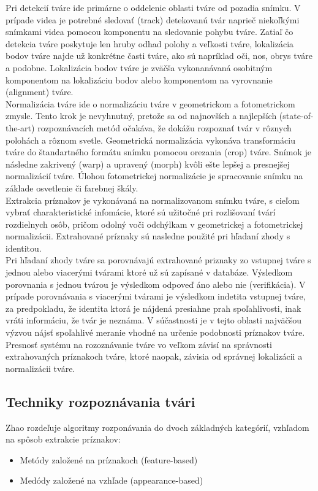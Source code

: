 \indent  Pri detekcií tváre ide primárne o oddelenie oblasti tváre od pozadia snímku.
V prípade videa je potrebné sledovať (track) detekovanú tvár naprieč niekoľkými snímkami videa pomocou komponentu na sledovanie pohybu tváre.
Zatiaľ čo detekcia tváre poskytuje len hruby odhad polohy a veľkosti tváre, lokalizácia bodov tváre najde už konkrétne časti tváre,
ako sú napríklad oči, nos, obrys tváre a podobne.
Lokalizácia bodov tváre je zväčša vykonanávaná osobitným komponentom na lokalizáciu bodov alebo komponentom na vyrovnanie (alignment) tváre.\cite{handbookface}\\
Normalizácia tváre ide o normalizáciu tváre v geometrickom a fotometrickom zmysle.
Tento krok je nevyhnutný, pretože sa od najnovších a najlepších (state-of-the-art) rozpoznávacích metód očakáva, že dokážu rozpoznať tvár v rôznych polohách a rôznom svetle.
Geometrická normalizácia vykonáva transformáciu tváre do štandartného formátu snímku pomocou orezania (crop) tváre.
Snímok je následne zakrivený (warp) a upravený (morph) kvôli ešte lepšej a presnejšej normalizácií tváre.
Úlohou fotometrickej normalizácie je spracovanie snímku na základe osvetlenie či farebnej škály.\cite{handbookface}\\
\indent Extrakcia príznakov je vykonávaná na normalizovanom snímku tváre, s cieľom vybrať charakteristické infomácie, ktoré sú užitočné pri rozlišovaní tvárí rozdielnych osôb,
pričom odolný voči odchýlkam v geometrickej a fotometrickej normalizácii.
Extrahované príznaky sú nasledne použité pri hľadaní zhody s identitou.\cite{handbookface}\\
\indent Pri hľadaní zhody tváre sa porovnávajú extrahované priznaky zo vstupnej tváre s jednou alebo viacerými tvárami ktoré už sú zapísané v databáze.
Výsledkom porovnania s jednou tvárou je výsledkom odpoveď áno alebo nie (verifikácia).
V prípade porovnávania s viacerými tvárami je výsledkom indetita vstupnej tváre, za predpokladu, že identita ktorá je nájdená presiahne prah spoľahlivosti,
inak vráti informáciu, že tvár je neznáma.
V súčastnosti je v tejto oblasti najväčšou výzvou nájsť spoľahlivé meranie vhodné na určenie podobnosti príznakov tváre.\cite{handbookface}\\
\indent Presnosť systému na rozoznávanie tváre vo veľkom závisí na správnosti extrahovaných príznakoch tváre, ktoré naopak, závisia od správnej lokalizácii a normalizácii tváre.

\subsection{Techniky rozpoznávania tvári}
Zhao rozdeľuje\cite{zhao2003face} algoritmy rozponávania do dvoch základných kategórií, vzhľadom na spôsob extrakcie príznakov:
\begin{itemize}
    \item Metódy založené na príznakoch (feature-based)
    \item Medódy založené na vzhľade (appearance-based)
\end{itemize}

